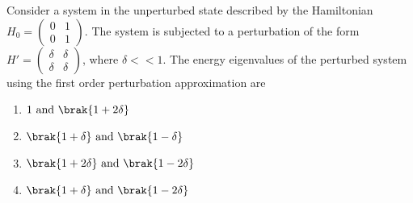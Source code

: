     \item Consider a system in the unperturbed state described by the Hamiltonian $H_0 = \begin{pmatrix} 0 & 1 \\ 0 & 1 \end{pmatrix}$. The system is subjected to a perturbation of the form $H' = \begin{pmatrix} \delta & \delta \\ \delta & \delta \end{pmatrix}$, where $\delta << 1$. The energy eigenvalues of the perturbed system using the first order perturbation approximation are 
    \begin{multicols}{2}
        \begin{enumerate}
            \item $1 \text{ and } \brak{1+2\delta}$
            \item $\brak{1+\delta} \text{ and } \brak{1-\delta}$
            \item $\brak{1+2\delta} \text{ and } \brak{1-2\delta}$
            \item $\brak{1+\delta} \text{ and } \brak{1-2\delta}$
        \end{enumerate}
    \end{multicols}

